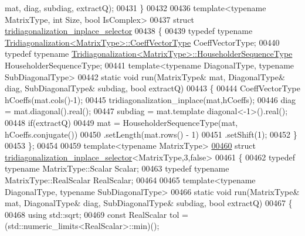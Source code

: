 \begin{DoxyCode}
      mat, diag, subdiag, extractQ);
00431 \}
00432 
00436 \textcolor{keyword}{template}<\textcolor{keyword}{typename} MatrixType, \textcolor{keywordtype}{int} Size, \textcolor{keywordtype}{bool} IsComplex>
00437 \textcolor{keyword}{struct }\hyperlink{struct_eigen_1_1internal_1_1tridiagonalization__inplace__selector}{tridiagonalization\_inplace\_selector}
00438 \{
00439   \textcolor{keyword}{typedef} \textcolor{keyword}{typename} \hyperlink{group___core___module}{Tridiagonalization<MatrixType>::CoeffVectorType}
       CoeffVectorType;
00440   \textcolor{keyword}{typedef} \textcolor{keyword}{typename} \hyperlink{group___householder___module_class_eigen_1_1_householder_sequence}{Tridiagonalization<MatrixType>::HouseholderSequenceType}
       HouseholderSequenceType;
00441   \textcolor{keyword}{template}<\textcolor{keyword}{typename} DiagonalType, \textcolor{keyword}{typename} SubDiagonalType>
00442   \textcolor{keyword}{static} \textcolor{keywordtype}{void} run(MatrixType& mat, DiagonalType& diag, SubDiagonalType& subdiag, \textcolor{keywordtype}{bool} extractQ)
00443   \{
00444     CoeffVectorType hCoeffs(mat.cols()-1);
00445     tridiagonalization\_inplace(mat,hCoeffs);
00446     diag = mat.diagonal().real();
00447     subdiag = mat.template diagonal<-1>().real();
00448     \textcolor{keywordflow}{if}(extractQ)
00449       mat = HouseholderSequenceType(mat, hCoeffs.conjugate())
00450             .setLength(mat.rows() - 1)
00451             .setShift(1);
00452   \}
00453 \};
00454 
00459 \textcolor{keyword}{template}<\textcolor{keyword}{typename} MatrixType>
\hyperlink{struct_eigen_1_1internal_1_1tridiagonalization__inplace__selector_3_01_matrix_type_00_013_00_01false_01_4}{00460} \textcolor{keyword}{struct }\hyperlink{struct_eigen_1_1internal_1_1tridiagonalization__inplace__selector}{tridiagonalization\_inplace\_selector}<MatrixType,3,false>
00461 \{
00462   \textcolor{keyword}{typedef} \textcolor{keyword}{typename} MatrixType::Scalar Scalar;
00463   \textcolor{keyword}{typedef} \textcolor{keyword}{typename} MatrixType::RealScalar RealScalar;
00464 
00465   \textcolor{keyword}{template}<\textcolor{keyword}{typename} DiagonalType, \textcolor{keyword}{typename} SubDiagonalType>
00466   \textcolor{keyword}{static} \textcolor{keywordtype}{void} run(MatrixType& mat, DiagonalType& diag, SubDiagonalType& subdiag, \textcolor{keywordtype}{bool} extractQ)
00467   \{
00468     \textcolor{keyword}{using} std::sqrt;
00469     \textcolor{keyword}{const} RealScalar tol = (std::numeric\_limits<RealScalar>::min)();

\end{DoxyCode}
